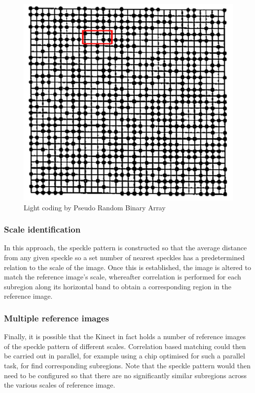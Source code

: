 \begin{figure}[ht]
    \begin{center}
        \includegraphics[width=1.0\textwidth]{images/prba.pdf}
        \caption{Light coding by Pseudo Random Binary Array}
        \label{fig:prba}
    \end{center}
\end{figure}


\subsubsection{Scale identification}

In this approach, the speckle pattern is constructed so that the average
distance from any given speckle so a set number of nearest speckles has a
predetermined relation to the scale of the image. Once this is established, the
image is altered to match the reference image's scale, whereafter correlation is
performed for each subregion along its horizontal band to obtain a corresponding
region in the reference image.


\subsubsection{Multiple reference images}

Finally, it is possible that the Kinect in fact holds a number of reference
images of the speckle pattern of different scales. Correlation based matching
could then be carried out in parallel, for example using a chip optimised for
such a parallel task, for find corresponding subregions. Note that the speckle
pattern would then need to be configured so that there are no significantly
similar subregions across the various scales of reference image.

